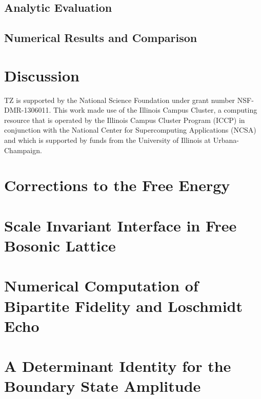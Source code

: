 \documentclass[reprint, prb]{revtex4-1}
\begin{document}
\subsection{Analytic Evaluation}
\label{sec_sub:analy_eval}

\subsection{Numerical Results and Comparison}


\section{Discussion}
\label{sec:disc}



\begin{acknowledgments}
    TZ is supported by the National Science Foundation under grant number NSF-DMR-1306011.
    This work made use of the Illinois Campus Cluster, a computing resource that is operated by the
    Illinois Campus Cluster Program (ICCP) in conjunction with the National Center for
    Supercomputing Applications (NCSA) and which is supported by funds from the University of
    Illinois at Urbana-Champaign.
\end{acknowledgments}

\appendix
\section{Corrections to the Free Energy}
\label{app:F_correction}


\section{Scale Invariant Interface in Free Bosonic Lattice}
\label{app:interface_free_boson}


\section{Numerical Computation of Bipartite Fidelity and Loschmidt Echo}
\label{app:comp_fid_echo}


\section{A Determinant Identity for the Boundary State Amplitude}
\label{app:pf_of_id}

\end{document}
